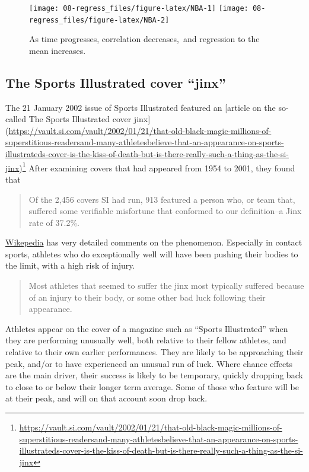 \documentclass[
  10pt,
  b5paper]{book}
\begin{document}
\begin{figure}[H]
\texttt{[image: 08-regress\_files/figure-latex/NBA-1]} \texttt{[image: 08-regress\_files/figure-latex/NBA-2]} \caption{As time progresses, correlation decreases, and regression to the mean increases.}\label{fig:NBA}
\end{figure}

\hypertarget{the-sports-illustrated-cover-jinx}{%
\subsection*{The Sports Illustrated cover ``jinx''}\label{the-sports-illustrated-cover-jinx}}

The 21 January 2002 issue of Sports Illustrated featured an
{[}article on the so-called The Sports Illustrated cover jinx{]}
(\url{https://vault.si.com/vault/2002/01/21/that-old-black-magic-millions-of-superstitious-readersand-many-athletesbelieve-that-an-appearance-on-sports-illustrateds-cover-is-the-kiss-of-death-but-is-there-really-such-a-thing-as-the-si-jinx})\footnote{\url{https://vault.si.com/vault/2002/01/21/that-old-black-magic-millions-of-superstitious-readersand-many-athletesbelieve-that-an-appearance-on-sports-illustrateds-cover-is-the-kiss-of-death-but-is-there-really-such-a-thing-as-the-si-jinx}}
After examining covers that had appeared from 1954 to 2001, they found that

\begin{quote}
Of the 2,456 covers SI had run, 913 featured a person who, or team that,
suffered some verifiable misfortune that conformed to our definition--a Jinx
rate of 37.2\%.
\end{quote}

\href{https://en.wikipedia.org/wiki/Sports_Illustrated_cover_jinx}{Wikepedia}
has very detailed comments on the phenomenon. Especially in contact sports,
athletes who do exceptionally well will have been pushing their bodies to the
limit, with a high risk of injury.

\begin{quote}
Most athletes that seemed to suffer the jinx most typically
suffered because of an injury to their body, or some other bad
luck following their appearance.
\end{quote}

Athletes appear on the cover of a magazine such as ``Sports Illustrated''
when they are performing unusually well, both relative to their fellow
athletes, and relative to their own earlier performances. They are
likely to be approaching their peak, and/or to have experienced an
unusual run of luck. Where chance effects are the main driver,
their success is likely to be temporary, quickly dropping back to close
to or below their longer term average. Some of those who feature will
be at their peak, and will on that account soon drop back.
\end{document}
